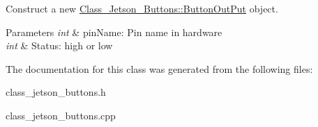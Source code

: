 Construct a new \hyperlink{classClass__Jetson__Buttons_ac93e60e7ed8d1e861f2f571151407d7d}{Class\+\_\+\+Jetson\+\_\+\+Buttons\+::\+Button\+Out\+Put} object. 


\begin{DoxyParams}{Parameters}
{\em int} & pin\+Name\+: Pin name in hardware \\
\hline
{\em int} & Status\+: high or low \\
\hline
\end{DoxyParams}


The documentation for this class was generated from the following files\+:\begin{DoxyCompactItemize}
\item 
class\+\_\+jetson\+\_\+buttons.\+h\item 
class\+\_\+jetson\+\_\+buttons.\+cpp\end{DoxyCompactItemize}

